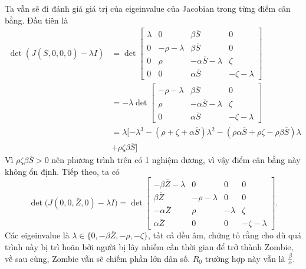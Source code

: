 \documentclass[12pt]{scrartcl}
\begin{document}
Ta vẫn sẽ đi đánh giá giá trị của eigeinvalue của Jacobian trong từng điểm cân bằng. Đầu tiên là 
\[
    \begin{aligned}
        \det(J(\overline{S},0,0,0) - \lambda I) &=\det \begin{bmatrix}
        \lambda & 0 & \beta \overline{S} & 0\\
        0 & -\rho - \lambda & \beta \overline{S} & 0\\
        0 & \rho & -\alpha\overline{S} - \lambda & \zeta\\
        0 & 0 & \alpha \overline{S} & -\zeta - \lambda
    \end{bmatrix}\\
    & = -\lambda \det\begin{bmatrix}
        -\rho - \lambda & \beta\overline{S} & 0\\
        \rho & -\alpha\overline{S} - \lambda & \zeta\\
        0 & \alpha\overline{S} & -\zeta - \lambda
    \end{bmatrix}\\
    & = \lambda[-\lambda^3 - (\rho + \zeta + \alpha\overline{S})\lambda^2 - (\rho\alpha\overline{S} + \rho\zeta - \rho\beta\overline{S})\lambda\\
    & + \rho\zeta\beta\overline{S}]
    \end{aligned}
\]
Vì $\rho\zeta\beta\overline{S} > 0$ nên phương trình trên có 1 nghiệm dương, vì vậy điểm cân bằng này không ổn định. Tiếp theo, ta có 
\[
\det\big( J(0,0,\bar{Z},0) - \lambda I \big) =
\det \begin{bmatrix}
-\beta \bar{Z} - \lambda & 0 & 0 & 0 \\
\beta \bar{Z} & -\rho - \lambda & 0 & 0 \\
-\alpha \bar{Z} & \rho & -\lambda & \zeta \\
\alpha \bar{Z} & 0 & 0 & -\zeta - \lambda
\end{bmatrix}.
\]
Các eigeinvalue là $\lambda \in \{0,-\beta\overline{Z}, -\rho, -\zeta\}$, tất cả đều âm, chứng tỏ rằng cho dù quá trình này bị trì hoãn bởi người bị lây nhiễm cần thời gian để trở thành Zombie, về sau cùng, Zombie vẫn sẽ chiếm phần lớn dân số. $R_0$ trường hợp này vẫn là $\frac{\beta}{\alpha}$.
\end{document}
